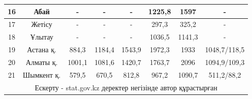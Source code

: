 \begin{table}[H]
{\begin{tabular}{|cccccccc|}
\multicolumn{1}{|c|}{16} &
  \multicolumn{1}{c|}{Абай} &
  \multicolumn{1}{c|}{-} &
  \multicolumn{1}{c|}{-} &
  \multicolumn{1}{c|}{-} &
  \multicolumn{1}{c|}{1225,8} &
  \multicolumn{1}{c|}{1597} &
  - \\ \hline
\multicolumn{1}{|c|}{17} &
  \multicolumn{1}{c|}{Жетісу} &
  \multicolumn{1}{c|}{-} &
  \multicolumn{1}{c|}{-} &
  \multicolumn{1}{c|}{-} &
  \multicolumn{1}{c|}{297,3} &
  \multicolumn{1}{c|}{325,2} &
  - \\ \hline
\multicolumn{1}{|c|}{18} &
  \multicolumn{1}{c|}{Ұлытау} &
  \multicolumn{1}{c|}{-} &
  \multicolumn{1}{c|}{-} &
  \multicolumn{1}{c|}{-} &
  \multicolumn{1}{c|}{1036,5} &
  \multicolumn{1}{c|}{1141,3} &
  - \\ \hline
\multicolumn{1}{|c|}{19} &
  \multicolumn{1}{c|}{Астана қ.} &
  \multicolumn{1}{c|}{884,3} &
  \multicolumn{1}{c|}{1184,4} &
  \multicolumn{1}{c|}{1543,9} &
  \multicolumn{1}{c|}{1972,3} &
  \multicolumn{1}{c|}{1933} &
  1048,7/118,5 \\ \hline
\multicolumn{1}{|c|}{20} &
  \multicolumn{1}{c|}{Алматы қ.} &
  \multicolumn{1}{c|}{1001,1} &
  \multicolumn{1}{c|}{1081,6} &
  \multicolumn{1}{c|}{1420,7} &
  \multicolumn{1}{c|}{1763,7} &
  \multicolumn{1}{c|}{2096} &
  1094,9/109,3 \\ \hline
\multicolumn{1}{|c|}{21} &
  \multicolumn{1}{c|}{Шымкент қ.} &
  \multicolumn{1}{c|}{579,5} &
  \multicolumn{1}{c|}{670,5} &
  \multicolumn{1}{c|}{812,8} &
  \multicolumn{1}{c|}{967,2} &
  \multicolumn{1}{c|}{1090,7} &
  511,2/88,2 \\ \hline
\multicolumn{8}{|c|}{Ескерту - stat.gov.kz деректер негізінде автор құрастырған} \\ \hline
\end{tabular}%
}
\end{table}

